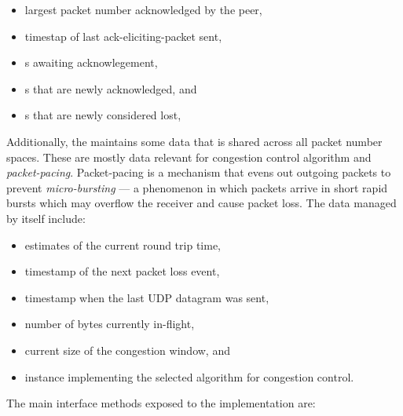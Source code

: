 \begin{itemize}

  \item largest packet number acknowledged by the peer,

  \item timestap of last \gls{ack-eliciting-packet} sent,

  \item \SentPacket{}s awaiting acknowlegement,

  \item \SentPacket{}s that are newly acknowledged, and

  \item \SentPacket{}s that are newly considered lost,

\end{itemize}

Additionally, the \RecoveryController{} maintains some data that is shared across all packet number
spaces. These are mostly data relevant for congestion control algorithm and
\textit{\gls{packet-pacing}}. Packet-pacing is a mechanism that evens out outgoing packets to
prevent \textit{\gls{micro-bursting}} --- a phenomenon in which packets arrive in short rapid bursts
which may overflow the receiver and cause packet loss. The data managed by \RecoveryController{}
itself include:

\begin{itemize}

  \item estimates of the current round trip time,

  \item timestamp of the next packet loss event,

  \item timestamp when the last UDP datagram was sent,

  \item number of bytes currently in-flight,

  \item current size of the congestion window, and

  \item \ICongestionController{} instance implementing the selected algorithm for congestion
control.

\end{itemize}

The main interface methods exposed to the \ManagedQuicConnection{} implementation are:

